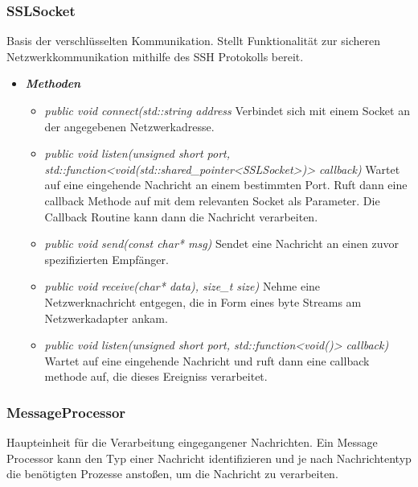 \documentclass[a4paper,12pt]{article}
\begin{document}
\subsubsection{SSLSocket}

Basis der verschlüsselten Kommunikation. Stellt Funktionalität zur sicheren Netzwerkkommunikation mithilfe des SSH Protokolls bereit.

	\begin{itemize}[label={}]

	\item\textit{\textbf{Methoden}}
		\begin{itemize}[label={\textbullet}]
			\item\textit{public void connect(std::string address} Verbindet sich mit einem Socket an der angegebenen Netzwerkadresse.
			\item\textit{public void listen(unsigned short port, std::function<void(std::shared\_pointer<SSLSocket>)> callback)} Wartet auf eine eingehende Nachricht an einem bestimmten Port. Ruft dann eine callback Methode auf mit dem relevanten Socket als Parameter. Die Callback Routine kann dann die Nachricht verarbeiten.
			\item\textit{public void send(const char* msg)} Sendet eine Nachricht an einen zuvor spezifizierten Empfänger.
			\item\textit{public void receive(char* data), size\_t size)} Nehme eine Netzwerknachricht entgegen, die in Form eines byte Streams am Netzwerkadapter ankam.
			\item\textit{public void listen(unsigned short port, std::function<void()> callback)} Wartet auf eine eingehende Nachricht und ruft dann eine callback methode auf, die dieses Ereigniss verarbeitet.

		\end{itemize}

\end{itemize}


\subsubsection{MessageProcessor}

Haupteinheit für die Verarbeitung eingegangener Nachrichten. Ein Message Processor kann den Typ einer Nachricht identifizieren und je nach Nachrichtentyp die benötigten Prozesse anstoßen, um die Nachricht zu verarbeiten.
\end{document}
